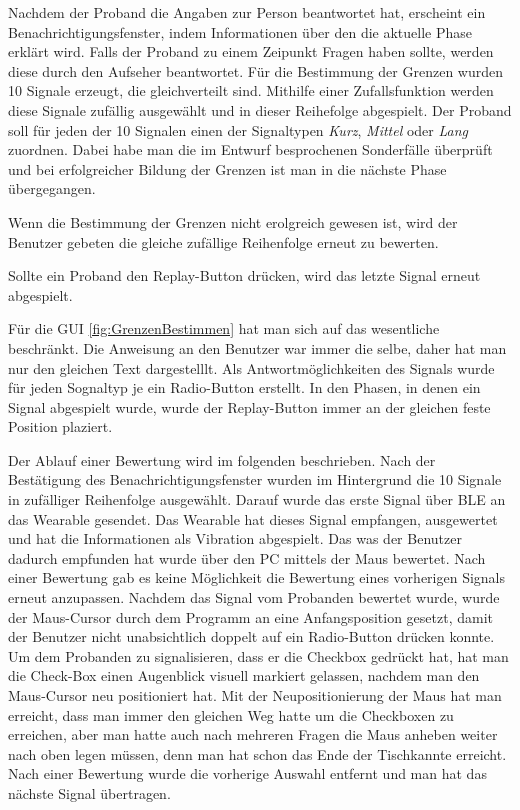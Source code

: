 Nachdem der Proband die Angaben zur Person beantwortet hat, erscheint ein Benachrichtigungsfenster, indem Informationen {\"u}ber den die aktuelle Phase erkl{\"a}rt wird. 
Falls der Proband zu einem Zeipunkt Fragen haben sollte, werden diese durch den Aufseher beantwortet.
F{\"u}r die Bestimmung der Grenzen wurden 10 Signale erzeugt, die gleichverteilt sind. 
Mithilfe einer Zufallsfunktion werden diese Signale zuf{\"a}llig ausgew{\"a}hlt und in dieser Reihefolge abgespielt. 
Der Proband soll f{\"u}r jeden der 10 Signalen einen der Signaltypen \textit{Kurz}, \textit{Mittel} oder \textit{Lang} zuordnen. 
Dabei habe man die im Entwurf besprochenen Sonderf{\"a}lle {\"u}berpr{\"u}ft und bei erfolgreicher Bildung der Grenzen ist man in die n{\"a}chste Phase {\"u}bergegangen.

Wenn die Bestimmung der Grenzen nicht erolgreich gewesen ist, wird der Benutzer gebeten die gleiche zuf{\"a}llige Reihenfolge erneut zu bewerten. 

Sollte ein Proband den Replay-Button dr{\"u}cken, wird das letzte Signal erneut abgespielt.

F{\"u}r die GUI \autoref{fig:GrenzenBestimmen} hat man sich auf das wesentliche beschr{\"a}nkt. Die Anweisung an den Benutzer war immer die selbe, daher hat man nur den gleichen Text dargestelllt. Als Antwortm{\"o}glichkeiten des Signals wurde f{\"u}r jeden Sognaltyp je ein Radio-Button erstellt. 
In den Phasen, in denen ein Signal abgespielt wurde, wurde der Replay-Button immer an der gleichen feste Position plaziert. 

Der Ablauf einer Bewertung wird im folgenden beschrieben. Nach der Best{\"a}tigung des Benachrichtigungsfenster wurden im Hintergrund die 10 Signale in zuf{\"a}lliger Reihenfolge ausgew{\"a}hlt. Darauf wurde das erste Signal {\"u}ber BLE an das Wearable gesendet. Das Wearable hat dieses Signal empfangen, ausgewertet und hat die Informationen als Vibration abgespielt. Das was der Benutzer dadurch empfunden hat wurde {\"u}ber den PC mittels der Maus bewertet. Nach einer Bewertung gab es keine M{\"o}glichkeit die Bewertung eines vorherigen Signals erneut anzupassen. Nachdem das Signal vom Probanden bewertet wurde, wurde der Maus-Cursor durch dem Programm an eine Anfangsposition gesetzt, damit der Benutzer nicht unabsichtlich doppelt auf ein Radio-Button dr{\"u}cken konnte. Um dem Probanden zu signalisieren, dass er die Checkbox gedr{\"u}ckt hat, hat man die Check-Box einen Augenblick visuell markiert gelassen, nachdem man den Maus-Cursor neu positioniert hat. Mit der Neupositionierung der Maus hat man erreicht, dass man immer den gleichen Weg hatte um die Checkboxen zu erreichen, aber man hatte auch nach mehreren Fragen die Maus anheben weiter nach oben legen m{\"u}ssen, denn man hat schon das Ende der Tischkannte erreicht. Nach einer Bewertung wurde die vorherige Auswahl entfernt und man hat das n{\"a}chste Signal {\"u}bertragen.


